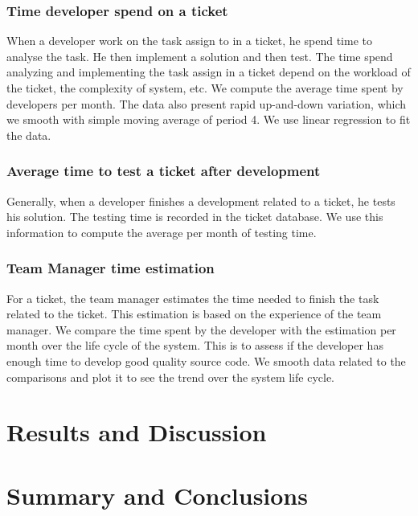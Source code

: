 \documentclass[10pt,conference]{IEEEtran}
\begin{document}
	\subsubsection{Time developer spend on a ticket }
	When a developer work on the task assign to in a ticket, he spend time to analyse  the task. He then implement a solution and then test. The time spend analyzing and implementing the task assign in a ticket depend on the workload  of the ticket, the complexity of system, etc.  
	We compute the average time spent by developers per month. 
	The data also present rapid up-and-down variation, which we smooth with simple moving average of period 4. We use  linear regression to fit the data.   
	\subsubsection{Average time  to test a ticket after development}
	Generally, when a developer finishes a development related to a ticket, he tests his solution.  
	The testing time is recorded in the ticket database.
	 We use this information to compute the average per month of testing time. 
	 \subsubsection{Team Manager time estimation}
	For a ticket, the team manager estimates the time needed to finish the task related to the ticket.
	This estimation is based on the experience of the team manager.  
	We compare the time spent by the developer with the estimation per month over the life cycle of the system.  
	This is to assess if the developer has enough time to develop good quality source code.
	 We smooth data related to the comparisons and plot it to see the trend over the system life cycle.
	 \section{Results and Discussion}\label{sec:results-discussion}
	
	
	  
	\section{Summary and Conclusions}\label{sec:conclusion}
	
	
	
	
	\vspace{12pt}
	
\end{document}
